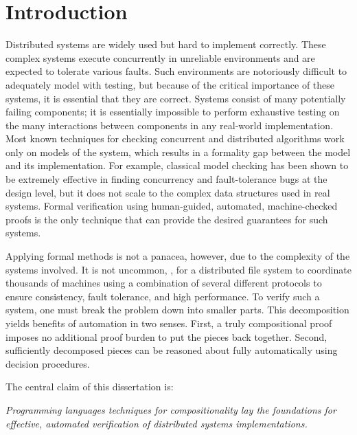 \chapter{Introduction}
\label{chap:intro}

Distributed systems are widely used but hard to implement correctly.
These complex systems execute concurrently in unreliable environments
and are expected to tolerate various faults.
  Such environments are
notoriously difficult to adequately model with testing, but because
of the critical importance of these systems, it is essential that
they are correct.
Systems consist of many potentially failing components; it is
essentially impossible to perform exhaustive testing on the many
interactions between components in any real-world
implementation.
Most known techniques for checking concurrent and
distributed algorithms work only on models of the system, which
results in a formality gap between the model and its
implementation. For example, classical model checking has been shown
to be extremely effective in finding concurrency and fault-tolerance
bugs at the design level, but it does not scale to the complex data
structures used in real systems.
Formal verification using
human-guided, automated, machine-checked proofs is the only
technique that can provide the desired guarantees for such systems.

Applying formal methods is not a panacea, however, due to the
complexity of the systems involved.  It is not uncommon, \eg, for a
distributed file system to coordinate thousands of machines using a
combination of several different protocols to ensure consistency,
fault tolerance, and high performance.  To verify such a
system, one must break the problem down into smaller parts.
This decomposition yields benefits of automation in two senses.
First, a truly compositional proof imposes no additional proof
burden to put the pieces back together. Second, sufficiently
decomposed pieces can be reasoned about fully automatically
using decision procedures. 

The central claim of this dissertation is:
\begin{center}
\emph{Programming languages techniques for compositionality
  lay the foundations for effective, automated verification of
  distributed systems implementations.
}
\end{center}


